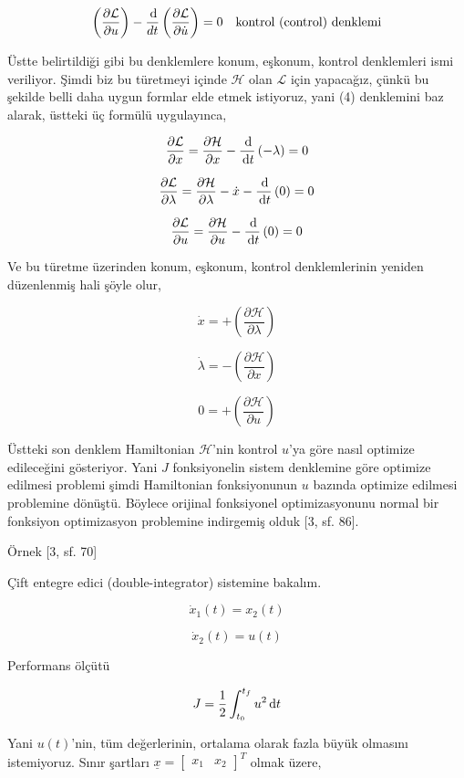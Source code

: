 \documentclass[12pt,fleqn]{article}\usepackage{../../common}
\begin{document}
$$
\left( \frac{\partial \mathcal{L}}{\partial u} \right) -
\frac{\,\mathrm{d}}{dt} \left( \frac{\partial \mathcal{L}}{\partial \dot{u}} \right) 
= 0
\quad
\textrm{kontrol (control) denklemi}
$$

Üstte belirtildiği gibi bu denklemlere konum, eşkonum, kontrol
denklemleri ismi veriliyor. Şimdi biz bu türetmeyi içinde
$\mathcal{H}$ olan $\mathcal{L}$ için yapacağız, çünkü bu şekilde
belli daha uygun formlar elde etmek istiyoruz, yani (4) denklemini baz
alarak, üstteki üç formülü uygulayınca,

$$
\frac{\partial \mathcal{L}}{\partial x} = 
\frac{\partial \mathcal{H}}{\partial x} - 
\frac{\,\mathrm{d}}{\,\mathrm{d} t} \left( -\lambda \right)   = 0
$$

$$
\frac{\partial \mathcal{L}}{\partial \lambda} = 
\frac{\partial \mathcal{H}}{\partial \lambda} - \dot{x} -
\frac{\,\mathrm{d}}{\,\mathrm{d} t} \left( 0 \right)   = 0
$$

$$
\frac{\partial \mathcal{L}}{\partial u} = 
\frac{\partial \mathcal{H}}{\partial u} - 
\frac{\,\mathrm{d}}{\,\mathrm{d} t} \left( 0 \right)   = 0
$$

Ve bu türetme üzerinden konum, eşkonum, kontrol denklemlerinin yeniden
düzenlenmiş hali şöyle olur,

$$
\dot{x} = + \left( \frac{\partial \mathcal{H}}{\partial \lambda} \right)
$$

$$
\dot{\lambda} = - \left( \frac{\partial \mathcal{H}}{\partial x} \right)
$$

$$
0 = + \left( \frac{\partial \mathcal{H}}{\partial u} \right)
$$


Üstteki son denklem Hamiltonian $\mathcal{H}$'nin kontrol $u$'ya göre
nasıl optimize edileceğini gösteriyor. Yani $J$ fonksiyonelin sistem
denklemine göre optimize edilmesi problemi şimdi Hamiltonian
fonksiyonunun $u$ bazında optimize edilmesi problemine
dönüştü. Böylece orijinal fonksiyonel optimizasyonunu normal bir
fonksiyon optimizasyon problemine indirgemiş olduk [3, sf. 86].

Örnek [3, sf. 70]

Çift entegre edici (double-integrator) sistemine bakalım. 

$$
\dot{x}_1(t) = x_2(t)
$$

$$
\dot{x}_2(t) = u(t)
$$

Performans ölçütü 

$$
J = \frac{1}{2} \int_{t_0}^{t_f} u^2 \,\mathrm{d} t
$$

Yani $u(t)$'nin, tüm değerlerinin, ortalama olarak fazla büyük
olmasını istemiyoruz. Sınır şartları $\underline{x} =
\left[\begin{array}{cc} x_1 & x_2 \end{array}\right]^T$ 
olmak üzere,
\end{document}

